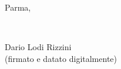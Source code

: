 \documentclass[11pt]{article}
\begin{document}
~\\
~\\
\vfill
\begin{minipage}[t]{7.0cm}
  \raggedright
  \parbox{7.0cm}{\centering
    Parma, %
  }\\
\end{minipage}%
\hfill
\begin{minipage}[t]{7.0cm}
  \parbox{7.0cm}{\centering
    Dario Lodi Rizzini \\
    {\footnotesize (firmato e datato digitalmente) }
  }
\end{minipage}


%
%
%
\end{document}
